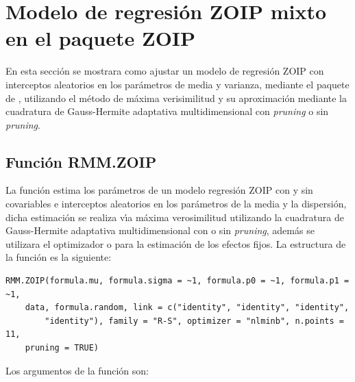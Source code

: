 \section{Modelo de regresi\'{o}n ZOIP mixto en el paquete ZOIP}

En esta secci\'{o}n se mostrara como ajustar un modelo de regresi\'{o}n ZOIP con interceptos aleatorios en los par\'{a}metros de media y varianza, mediante el paquete  de , utilizando el m\'{e}todo de m\'{a}xima verisimilitud y su aproximaci\'{o}n mediante la cuadratura de Gauss-Hermite adaptativa multidimensional con \textit{pruning} o sin \textit{pruning}.

\subsection{Funci\'{o}n RMM.ZOIP} 

La funci\'{o}n  estima los par\'{a}metros de un modelo regresi\'{o}n ZOIP con y sin covariables e interceptos aleatorios en los par\'{a}metros de la media y la dispersi\'{o}n, dicha estimaci\'{o}n se realiza v\'{\i}a m\'{a}xima verosimilitud utilizando la cuadratura de Gauss-Hermite adaptativa multidimensional con o sin \textit{pruning}, adem\'{a}s se utilizara el optimizador  o  para la estimaci\'{o}n de los efectos fijos. La estructura de la funci\'{o}n  es la siguiente:

\begin{verbatim}
RMM.ZOIP(formula.mu, formula.sigma = ~1, formula.p0 = ~1, formula.p1 = ~1, 
    data, formula.random, link = c("identity", "identity", "identity", 
        "identity"), family = "R-S", optimizer = "nlminb", n.points = 11, 
    pruning = TRUE)
\end{verbatim}

Los argumentos de la funci\'{o}n  son:


